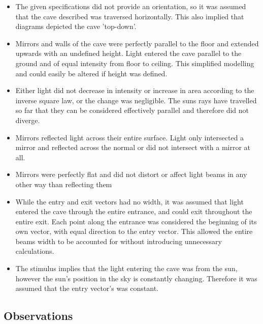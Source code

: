 \documentclass[11pt, letterpaper]{article}
\begin{document}
	\begin{itemize}
		
		\item The given specifications did not provide an orientation, so it was assumed that the cave described was traversed horizontally. This also implied that diagrams depicted the cave 'top-down'.
		
		\item Mirrors and walls of the cave were perfectly parallel to the floor and extended upwards with an undefined height. Light entered the cave parallel to the ground and of equal intensity from floor to ceiling. This simplified modelling and could easily be altered if height was defined. 
		
		
		\item Either light did not decrease in intensity or increase in area according to the inverse square law, or the change was negligible. The suns rays have travelled so far that they can be considered effectively parallel and therefore did not diverge. 
		\cite{yasuda_2024_why}
		
		\item Mirrors reflected light across their entire surface. Light only intersected a mirror and reflected across the normal or did not intersect with a mirror at all.
		
		\item Mirrors were perfectly flat and did not distort or affect light beams in any other way than reflecting them
		
		\item While the entry and exit vectors had no width, it was assumed that light entered the cave through the entire entrance, and could exit throughout the entire exit. Each point along the entrance was considered the beginning of its own vector, with equal direction to the entry vector.  This allowed the entire beams width to be accounted for without introducing unnecessary calculations. 
		
		\item The stimulus implies that the light entering the cave was from the sun, however the sun's position in the sky is constantly changing. Therefore it was assumed that the entry vector's was constant.
		
		
		
	\end{itemize}
	
	\subsection{Observations}
	\par
	
\end{document}
